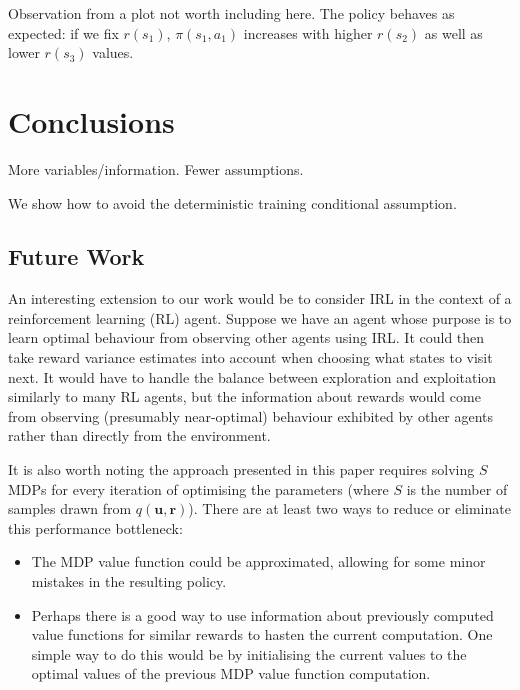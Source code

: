 \documentclass{mpaper}
\newcommand{\approximation}{q(\mathbf{u}, \mathbf{r})}
\begin{document}
Observation from a plot not worth including here. The policy behaves as
expected: if we fix $r(s_1)$, $\pi(s_1, a_1)$ increases with higher $r(s_2)$ as
well as lower $r(s_3)$ values.


\section{Conclusions}

More variables/information. Fewer assumptions.

We show how to avoid the deterministic training conditional assumption.

\subsection{Future Work}

An interesting extension to our work would be to consider IRL in the context
of a reinforcement learning (RL) agent. Suppose we have an agent whose purpose
is to learn optimal behaviour from observing other agents using IRL. It could
then take reward variance estimates into account when choosing what states to
visit next. It would have to handle the balance between exploration and
exploitation similarly to many RL agents, but the information about rewards
would come from observing (presumably near-optimal) behaviour exhibited by other
agents rather than directly from the environment.

It is also worth noting the approach presented in this paper requires solving
$S$ MDPs for every iteration of optimising the parameters (where $S$ is the
number of samples drawn from $\approximation$). There are at least two ways to
reduce or eliminate this performance bottleneck:
\begin{itemize}
\item The MDP value function could be approximated, allowing for some minor
  mistakes in the resulting policy.
\item Perhaps there is a good way to use information about previously computed
  value functions for similar rewards to hasten the current computation. One
  simple way to do this would be by initialising the current values to the
  optimal values of the previous MDP value function computation.
\end{itemize}
\end{document}
